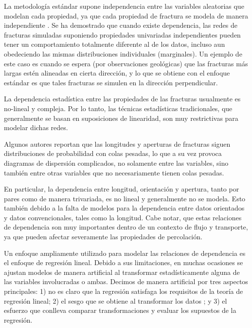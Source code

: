 La metodolog\'ia est\'andar supone independencia entre las variables aleatorias que modelan cada propiedad, ya que cada propiedad de fractura se modela de manera independiente \citep{elmo_discrete_2014,bourbiaux_integrated_2002,zellou_integrated_2003,gringarten_geometric_1997,adler_fractures_1999}.
Se ha demostrado \citep{mendoza-torres_bernstein_2017} que cuando existe dependencia, las redes de fracturas simuladas suponiendo propiedades univariadas independientes pueden tener un comportamiento totalmente diferente al de los datos, incluso aun obedeciendo las mismas distribuciones individuales (marginales).
Un ejemplo de este caso es cuando se espera (por observaciones geol\'ogicas) que las fracturas m\'as largas est\'en alineadas en cierta direcci\'on, y lo que se obtiene con el enfoque est\'andar es que tales fracturas se simulen en la direcci\'on perpendicular.

La dependencia estad\'istica entre las propiedades de las fracturas usualmente es no-lineal y compleja. Por lo tanto, las t\'ecnicas estad\'isticas tradicionales, que generalmente se basan en suposiciones de linearidad, son muy restrictivas para modelar dichas redes.

Algunos autores \citep{balankin_distribution_2001,olson_fracture_2007} reportan que las longitudes y aperturas de fracturas siguen distribuciones de probabilidad con colas pesadas, lo que a su vez provoca diagramas de dispersi\'on complicados, no solamente entre las variables, sino tambi\'en entre otras variables que no necesariamente tienen colas pesadas.

En particular, la dependencia entre longitud, orientaci\'on y apertura, tanto por pares como de manera trivariada, es no lineal y generalmente no se modela.
Esto tambi\'en debido a la falta de modelos para la dependencia entre datos orientados y datos convencionales, tales como la longitud.
Cabe notar, que estas relaciones de dependencia son muy importantes dentro de un contexto de flujo y transporte, ya que pueden afectar severamente las propiedades de percolaci\'on.

Un enfoque ampliamente utilizado para modelar las relaciones de dependencia es el enfoque de regresi\'on lineal.
Debido a sus limitaciones, en muchas ocasiones se ajustan modelos de manera artificial al transformar estad\'isticamente alguna de las variables involucradas o ambas.
Decimos de manera artificial por tres aspectos principales: 1) no es claro que la regresi\'on satisfaga los requisitos de la teor\'ia de regresi\'on lineal; 2) el sesgo que se obtiene al transformar los datos \citep{seber_nonlinear_2003,miller_reducing_1984,box_bias_1971}; y 3) el esfuerzo que conlleva comparar transformaciones y evaluar los supuestos de la regresi\'on.

